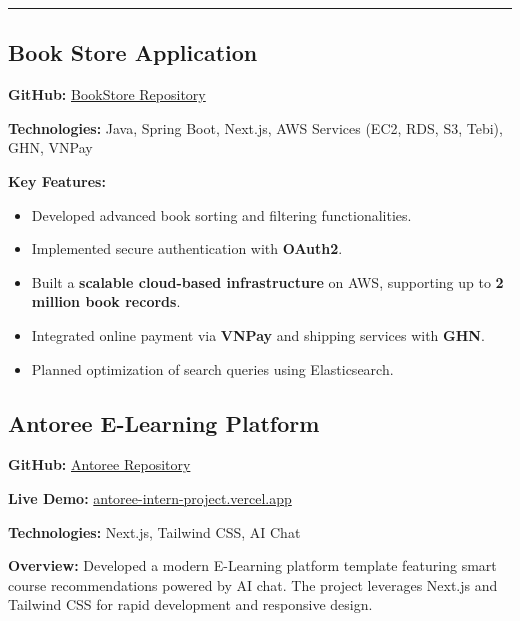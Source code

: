 \documentclass[11pt,a4paper]{article}
\begin{document}
\begin{adjustwidth}{2em}{}
\begin{multicols}{2}
\end{multicols}

\begin{center}
    \rule{0.8\textwidth}{0.5pt}
\end{center}

\begin{multicols}{2}


\subsection{Book Store Application}

\textbf{GitHub:} \href{https://github.com/shegga9x/book-store-app}{BookStore Repository}

\textbf{Technologies:} Java, Spring Boot, Next.js, AWS Services (EC2, RDS, S3, Tebi), GHN, VNPay

\textbf{Key Features:}
\begin{itemize}[leftmargin=*]
    \item Developed advanced book sorting and filtering functionalities.
    \item Implemented secure authentication with \textbf{OAuth2}.
    \item Built a \textbf{scalable cloud-based infrastructure} on AWS, supporting up to \textbf{2 million book records}.
    \item Integrated online payment via \textbf{VNPay} and shipping services with \textbf{GHN}.
    \item Planned optimization of search queries using Elasticsearch.
\end{itemize}

\vspace{1em}

\subsection{Antoree E-Learning Platform}

\textbf{GitHub:} \href{https://github.com/phungle2508/Antoree-Intern-Project}{Antoree Repository}

\textbf{Live Demo:} \href{https://antoree-intern-project.vercel.app}{antoree-intern-project.vercel.app}

\textbf{Technologies:} Next.js, Tailwind CSS, AI Chat

\textbf{Overview:} Developed a modern E-Learning platform template featuring smart course recommendations powered by AI chat. The project leverages Next.js and Tailwind CSS for rapid development and responsive design.


\end{multicols}
\end{adjustwidth}
\end{document}
